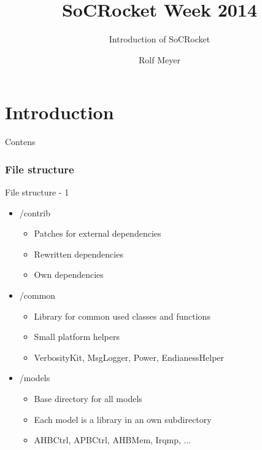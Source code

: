 \documentclass[fleqn,11pt,aspectratio=43]{beamer}
\title{SoCRocket Week 2014}
\subtitle{Introduction of SoCRocket}
\author{Rolf Meyer}
\begin{document}
\begin{frame}[plain]
\titlepage
\end{frame}

\part{Introduction}

\begin{frame}[plain]
  \partpage
\end{frame}
\begin{frame}{Contens}
\tableofcontents
\end{frame}

\section{File structure}

\begin{frame}{File structure - 1}

\begin{itemize}
  \item /contrib
  \begin{itemize}
    \item Patches for external dependencies
    \item Rewritten dependencies
    \item Own dependencies
  \end{itemize}
  \item /common
  \begin{itemize}
    \item Library for common used classes and functions
    \item Small platform helpers
    \item VerbosityKit, MsgLogger, Power, EndianessHelper
  \end{itemize}
  \item /models
  \begin{itemize}
    \item Base directory for all models
    \item Each model is a library in an own subdirectory
    \item AHBCtrl, APBCtrl, AHBMem, Irqmp, ...
  \end{itemize}
\end{itemize}
\end{frame}
\end{document}
